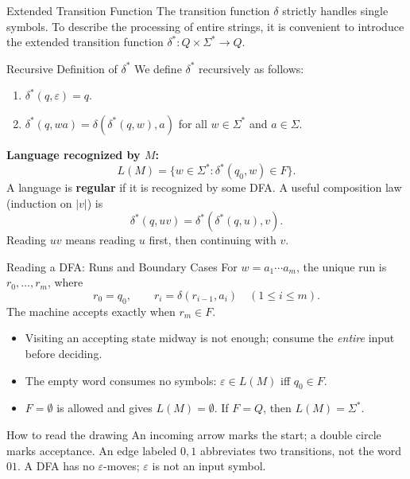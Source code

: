 \documentclass[10pt]{beamer}
\begin{document}
\begin{frame}{Extended Transition Function}
  \small
  The transition function $\delta$ strictly handles single symbols. To describe the processing of entire strings, it is convenient to introduce the extended transition function $\delta^* : Q \times \Sigma^* \rightarrow Q$.
  \pause
  \begin{block}{Recursive Definition of $\delta^*$}
    We define $\delta^*$ recursively as follows:
    \begin{enumerate}
        \item $\delta^*(q, \varepsilon) = q$.
        \item $\delta^*(q, wa) = \delta(\delta^*(q,w), a)$  for all $w \in \Sigma^*$ and $a \in \Sigma$.
    \end{enumerate}
  \end{block}
  \pause
  \vspace{0.2cm}
  \textbf{Language recognized by $M$:}
  \[
    L(M)=\{w\in\Sigma^*: \delta^*(q_0,w)\in F\}.
  \]
  A language is \textbf{regular} if it is recognized by some DFA.
  \pause
  A useful composition law (induction on $|v|$) is
  \[
    \delta^*(q,uv)=\delta^*(\delta^*(q,u),v).
  \]
  Reading $uv$ means reading $u$ first, then continuing with $v$.
\end{frame}

\begin{frame}{Reading a DFA: Runs and Boundary Cases}
  \small
  For $w=a_1\cdots a_m$, the unique run is $r_0,\ldots,r_m$, where
  \[
    r_0=q_0,\qquad r_i=\delta(r_{i-1},a_i)\quad(1\le i\le m).
  \]
  The machine accepts exactly when $r_m\in F$.
  \pause
  \begin{itemize}
    \item Visiting an accepting state midway is not enough; consume the
      \emph{entire} input before deciding.
    \item The empty word consumes no symbols:
      $\varepsilon\in L(M)$ iff $q_0\in F$.
    \item $F=\emptyset$ is allowed and gives $L(M)=\emptyset$.
      If $F=Q$, then $L(M)=\Sigma^*$.
  \end{itemize}
  \pause
  \begin{block}{How to read the drawing}
    An incoming arrow marks the start; a double circle marks acceptance.
    An edge labeled $0,1$ abbreviates two transitions, not the word $01$.
    A DFA has no $\varepsilon$-moves; $\varepsilon$ is not an input symbol.
  \end{block}
\end{frame}
\end{document}
